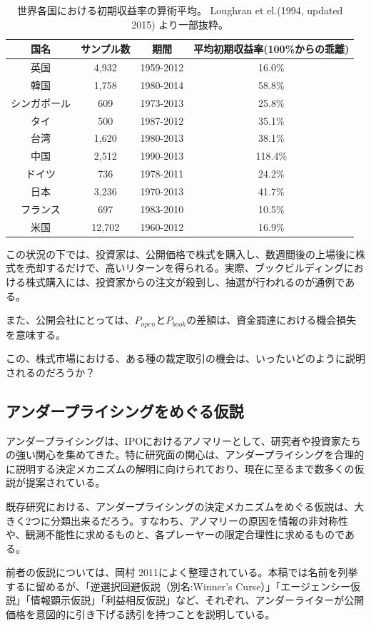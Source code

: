 \documentclass{jsarticle}
\begin{document}
\begin{table}[h]
	\caption{世界各国における初期収益率の算術平均。
	Loughran et el.(1994, updated 2015) \cite{Loughran}より一部抜粋。}
	\label{around_world}
	\centering
	\begin{tabular}{cccc}
		\hline
		国名&サンプル数&期間&平均初期収益率(100\%からの乖離) \\
		\hline \hline
		英国&4,932&1959-2012&16.0\% \\
		韓国&1,758&1980-2014& 58.8\% \\
		シンガポール&609&1973-2013&25.8\% \\
		タイ&500&1987-2012&35.1\%\\
		台湾 &1,620 &1980-2013&38.1\% \\
		中国&2,512&1990-2013&118.4\%\\
		ドイツ&736&1978-2011&24.2\% \\
		日本&3,236&1970-2013&41.7\% \\
		フランス & 697 & 1983-2010 & 10.5\% \\
		米国&12,702&1960-2012&16.9\%\\
		\hline
	\end{tabular}
	\end{table}
	 \par

この状況の下では、投資家は、公開価格で株式を購入し、数週間後の上場後に株式を売却するだけで、高いリターンを得られる。実際、ブックビルディングにおける株式購入には、投資家からの注文が殺到し、抽選が行われるのが通例である。\par
また、公開会社にとっては、$P_{open}$と$P_{book}$の差額は、資金調達における機会損失を意味する。 \\ \par
この、株式市場における、ある種の裁定取引の機会は、いったいどのように説明されるのだろうか？





\subsection{アンダープライシングをめぐる仮説}
アンダープライシングは、IPOにおけるアノマリーとして、研究者や投資家たちの強い関心を集めてきた。特に研究面の関心は、アンダープライシングを合理的に説明する決定メカニズムの解明に向けられており、現在に至るまで数多くの仮説が提案されている。\par
既存研究における、アンダープライシングの決定メカニズムをめぐる仮説は、大きく2つに分類出来るだろう。すなわち、アノマリーの原因を情報の非対称性や、観測不能性に求めるものと、各プレーヤーの限定合理性に求めるものである。\\ \par
前者の仮説については、岡村 2011\cite{okamura}によく整理されている。本稿では名前を列挙するに留めるが、「逆選択回避仮説（別名:Winner's Curse）」「エージェンシー仮説」「情報顕示仮説」「利益相反仮説」など、それぞれ、アンダーライターが公開価格を意図的に引き下げる誘引を持つことを説明している。\par
\end{document}

